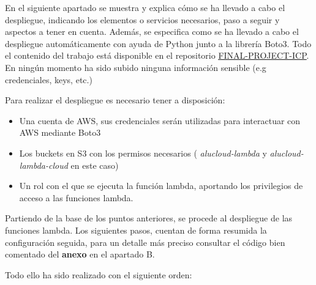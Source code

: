 \documentclass[
]{article}
\begin{document}
En el siguiente apartado se muestra y explica cómo se ha llevado a cabo
el despliegue, indicando los elementos o servicios necesarios, paso a
seguir y aspectos a tener en cuenta. Además, se especifica como se ha
llevado a cabo el despliegue automáticamente con ayuda de Python junto a
la librería Boto3. Todo el contenido del trabajo está disponible en el repositorio \underline{\href{https://github.com/manujose94/FINAL-PROJECT-ICP}{FINAL-PROJECT-ICP}}. En ningún momento ha sido subido ninguna información sensible (e.g credenciales, keys, etc.) 

Para realizar el despliegue es necesario tener a disposición:

\begin{itemize}
\item
  Una cuenta de AWS, sus credenciales serán utilizadas para interactuar
  con AWS mediante Boto3
\item
  Los buckets en S3 con los permisos necesarios ( \emph{alucloud-lambda}
  y \emph{alucloud-lambda-cloud} en este caso)
\item
  Un rol con el que se ejecuta la función lambda, aportando los
  privilegios de acceso a las funciones lambda.
\end{itemize}

Partiendo de la base de los puntos anteriores, se procede al despliegue
de las funciones lambda. Los siguientes pasos, cuentan de forma resumida
la configuración seguida, para un detalle más preciso consultar el
código bien comentado del \textbf{anexo} en el apartado B.

Todo ello ha sido realizado con el siguiente orden:
\end{document}
